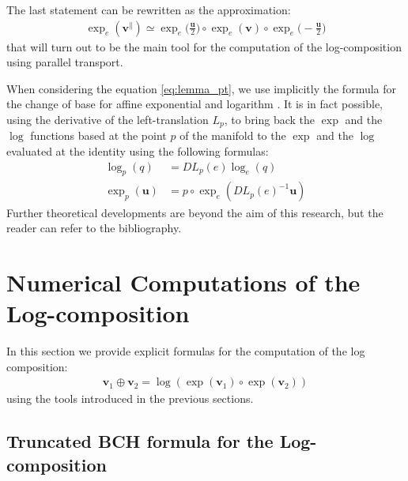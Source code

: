 \noindent
The last statement can be rewritten as the approximation:
\begin{align}\label{eq:parallel_transport_main_approximation}
\exp_{e}(\mathbf{v}^{\parallel}) 
\simeq
\exp_{e}\big(\frac{\mathbf{u}}{2}\big)   
\circ  \exp_{e}(\mathbf{v}) 
\circ \exp_{e}\big(-\frac{\mathbf{u}}{2}\big)
\end{align}
that will turn out to be the main tool for the computation of the log-composition using parallel transport.


When considering the equation \ref{eq:lemma_pt}, we use implicitly the formula for the change of base for affine exponential and logarithm \cite{arsigny2006bi}. It is in fact possible, using the derivative of the left-translation $L_{p}$, to bring back the $\exp$ and the $\log$ functions based at the point $p$ of the manifold to the $\exp$ and the $\log$ evaluated at the identity using the following formulas:
\begin{align}\label{eq:DL_DR}
\log _{p}(q)  &= DL_{p}(e) \log _{e}(q)  \\
\exp _{p}(\mathbf{u})  &= p\circ \exp_{e} (DL_{p}(e)^{-1} \mathbf{u})
\end{align}
\noindent
Further theoretical developments are beyond the aim of this research, but the reader can refer to the bibliography.




\section{Numerical Computations of the Log-composition}

In this section we provide explicit formulas for the computation of the log composition:
\begin{align*}
\mathbf{v}_{1}\oplus \mathbf{v}_{2} =  \log(\exp(\mathbf{v}_1)\circ \exp(\mathbf{v}_2))
\end{align*}
using the tools introduced in the previous sections.

\subsection{Truncated BCH formula for the Log-composition}\label{se:bch_formula}

